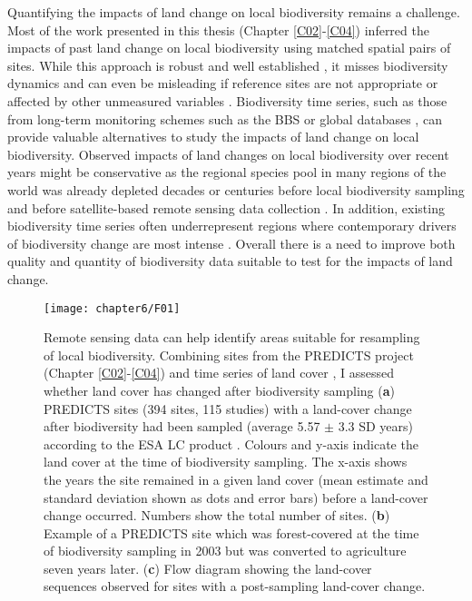 Quantifying the impacts of land change on local biodiversity remains a challenge. Most of the work presented in this thesis (Chapter \ref{C02}-\ref{C04}) inferred the impacts of past land change on local biodiversity using matched spatial pairs of sites. While this approach is robust and well established \citep{Purvis2018}, it misses biodiversity dynamics and can even be misleading if reference sites are not appropriate or affected by other unmeasured variables \citep{Franca2016,Jung2016,DePalma2018}. Biodiversity time series, such as those from long-term monitoring schemes such as the BBS \citep{Pardieck2018} or global databases \citep[\eg BioTime, ][]{Dornelas2018}, can provide valuable alternatives to study the impacts of land change on local biodiversity. Observed impacts of land changes on local biodiversity over recent years might be conservative as the regional species pool in many regions of the world was already depleted decades or centuries before local biodiversity sampling and before satellite-based remote sensing data collection \citep{Newbold2016a,Mihoub2017}. In addition, existing biodiversity time series often underrepresent regions where contemporary drivers of biodiversity change are most intense \citep{Gonzalez2016,Cardinale2018}. Overall there is a need to improve both quality and quantity of biodiversity data suitable to test for the impacts of land change.

\begin{figure}[htb]
\centering
\texttt{[image: chapter6/F01]}
\caption{ Remote sensing data can help identify areas suitable for resampling of local biodiversity. Combining sites from the PREDICTS project (Chapter \ref{C02}-\ref{C04}) and time series of land cover \citep{ESA2017}, I assessed whether land cover has changed after biodiversity sampling (\textbf{a}) PREDICTS sites (394 sites, 115 studies) with a land-cover change after biodiversity had been sampled (average 5.57 $\pm$ 3.3 SD years) according to the ESA LC product \citep{ESA2017}. Colours and y-axis indicate the land cover at the time of biodiversity sampling. The x-axis shows the years the site remained in a given land cover (mean estimate and standard deviation shown as dots and error bars) before a land-cover change occurred. Numbers show the total number of sites. (\textbf{b}) Example of a PREDICTS site which was forest-covered at the time of biodiversity sampling in 2003 but was converted to agriculture seven years later. (\textbf{c}) Flow diagram showing the land-cover sequences observed for sites with a post-sampling land-cover change.}
\label{F06_01}
\end{figure}

